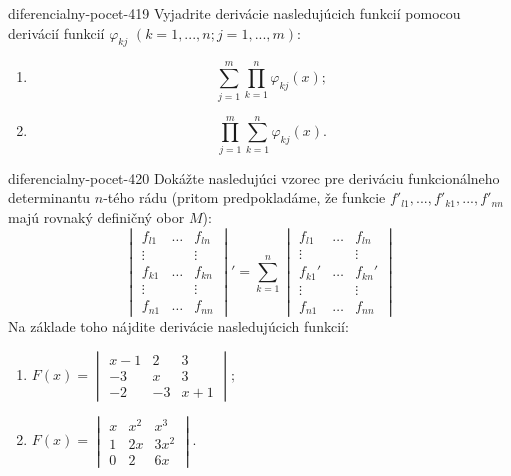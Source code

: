 \begin{defproblem}{diferencialny-pocet-419}
Vyjadrite derivácie nasledujúcich funkcií pomocou derivácií funkcií $\varphi_{kj}$ $(k=1,...,n; j=1,...,m)$:
\begin{multicols}{2}
\begin{enumerate}
    \item $$\sum_{j=1}^{m}\prod_{k=1}^n \varphi_{kj}(x);$$
	\item $$\prod_{j=1}^{m}\sum_{k=1}^n \varphi_{kj}(x).$$
\end{enumerate}
\end{multicols}
\end{defproblem}

\begin{defproblem}{diferencialny-pocet-420}
Dokážte nasledujúci vzorec pre deriváciu funkcionálneho determinantu $n$-tého rádu (pritom predpokladáme, že funkcie $f'_{l1},...,f'_{k1},...,f'_{nn}$ majú rovnaký definičný obor $M$):
$$\begin{vmatrix}
f_{l1} & \dots & f_{ln} \\
\vdots & & \vdots\\
f_{k1} & \dots & f_{kn} \\
\vdots & & \vdots\\
f_{n1} & \dots & f_{nn}
\end{vmatrix}'
= \sum_{k=1}^n
\begin{vmatrix}
f_{l1} & \dots & f_{ln} \\
\vdots & & \vdots\\
f_{k1}' & \dots & f_{kn}' \\
\vdots & & \vdots\\
f_{n1} & \dots & f_{nn}
\end{vmatrix}$$
Na základe toho nájdite derivácie nasledujúcich funkcií:
\begin{multicols}{2}
\begin{enumerate}
\item $F(x)=
\begin{vmatrix}
x-1 & 2 & 3 \\
-3 & x & 3 \\
-2 & -3 & x+1
\end{vmatrix};$
\item $F(x)=
\begin{vmatrix}
x & x^2 & x^3 \\
1 & 2x & 3x^2 \\
0 & 2 & 6x
\end{vmatrix}.$
\end{enumerate}
\end{multicols}
\end{defproblem}

